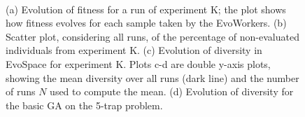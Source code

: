 \begin{figure}[t]
    \centering
    \\
    \caption{
    (a) Evolution of fitness for a run of experiment K; the plot shows how fitness evolves for each sample taken by the EvoWorkers.
    (b) Scatter plot, considering all runs, of the percentage of non-evaluated individuals from experiment K.
    (c) Evolution of diversity in EvoSpace for experiment K.
    Plots c-d are double y-axis plots, showing the mean diversity over all runs (dark line) and the number of runs $N$ used to compute the mean.
    (d) Evolution of diversity for the basic GA on the 5-trap problem.}
    \label{fig:others}
\end{figure}

